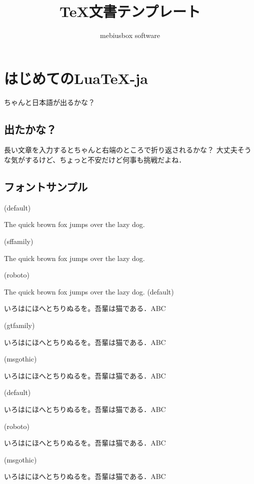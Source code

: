\documentclass[a4paper,11pt]{ltjsarticle}
\title{\TeX 文書テンプレート}
\author{mebiusbox software}
\begin{document}
    \maketitle
    \section{はじめてのLua\TeX-ja}
    ちゃんと日本語が出るかな？
    \subsection{出たかな？}
    長い文章を入力するとちゃんと右端のところで折り返されるかな？
    大丈夫そうな気がするけど、ちょっと不安だけど何事も挑戦だよね．
    \subsection{フォントサンプル}
    (default)\par
    The quick brown fox jumps over the lazy dog.\par
    (sffamily)\par
    {\sffamily The quick brown fox jumps over the lazy dog.}\par
    (roboto)\par
    {The quick brown fox jumps over the lazy dog.}
    (default)\par
    いろはにほへとちりぬるを。吾輩は猫である．ABC\par
    (gtfamily)\par
    {\gtfamily いろはにほへとちりぬるを。吾輩は猫である．ABC}\par
    (msgothic)\par
    {いろはにほへとちりぬるを。吾輩は猫である．ABC}\par
    (default)\par
    いろはにほへとちりぬるを。吾輩は猫である．ABC\par
    (roboto)\par
    {\roboto いろはにほへとちりぬるを。吾輩は猫である．ABC}\par
    (msgothic)\par
    {\msgothic いろはにほへとちりぬるを。吾輩は猫である．ABC}\par
    {}\par
\end{document}
